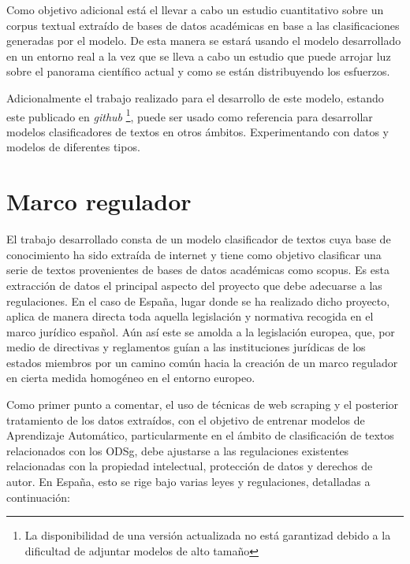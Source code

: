 Como objetivo adicional está el llevar a cabo un estudio cuantitativo sobre un corpus textual extraído de bases de datos académicas en base a las clasificaciones generadas por el modelo. De esta manera se estará usando el modelo desarrollado en un entorno real a la vez que se lleva a cabo un estudio que puede arrojar luz sobre el panorama científico actual y como se están distribuyendo los esfuerzos.

Adicionalmente el trabajo realizado para el desarrollo de este modelo, estando este publicado en \textit{github} \cite{ignacioaguileratfg} \footnote{La disponibilidad de una versión actualizada no está garantizad debido a la dificultad de adjuntar modelos de alto tamaño}, puede ser
usado como referencia para desarrollar modelos clasificadores de textos en otros
ámbitos. Experimentando con datos y modelos de diferentes tipos.

\section{Marco regulador}
El trabajo desarrollado consta de un modelo clasificador de textos cuya base de
conocimiento ha sido extraída de internet y tiene como objetivo clasificar una
serie de textos provenientes de bases de datos académicas como scopus. Es esta
extracción de datos el principal aspecto del proyecto que debe adecuarse a las
regulaciones. En el caso de España, lugar donde se ha realizado dicho proyecto,
aplica de manera directa toda aquella legislación y normativa recogida en el
marco jurídico español. Aún así este se amolda a la legislación europea, que,
por medio de directivas y reglamentos guían a las instituciones jurídicas de los
estados miembros por un camino común hacia la creación de un marco regulador en
cierta medida homogéneo en el entorno europeo.

Como primer punto a comentar, el uso de técnicas de web scraping y el posterior
tratamiento de los datos extraídos, con el objetivo de entrenar modelos de
Aprendizaje Automático, particularmente en el ámbito de clasificación de textos
relacionados con los \gls{ODSg}, debe ajustarse a las
regulaciones existentes relacionadas con la propiedad intelectual, protección de
datos y derechos de autor. En España, esto se rige bajo varias leyes y
regulaciones, detalladas a continuación:

